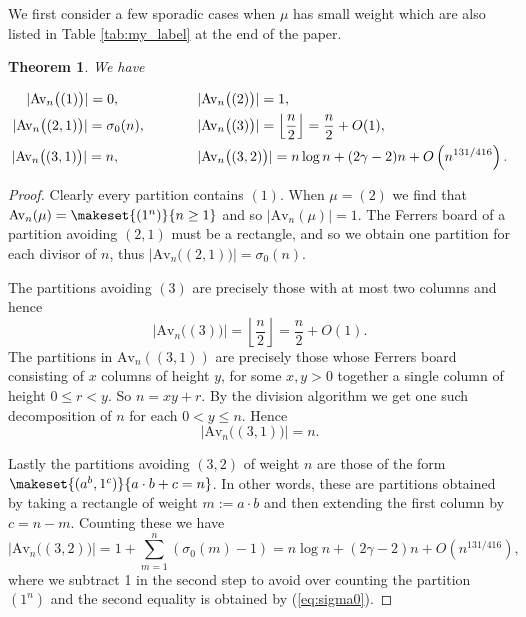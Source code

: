 \documentclass{article}
\theoremstyle{plain}
\newtheorem{theorem}{Theorem}[section]
\theoremstyle{definition}
\newcommand{\Av}{\text{Av}}
\begin{document}
We first consider a few sporadic cases when $\mu$ has small weight which are also listed in Table \ref{tab:my_label} at the end of the paper.
\begin{theorem} \label{thm:sporadic}
We have  
\end{theorem} 
\vspace{-8mm}  %
\begin{align*}
    |\Av_n \big((1)\big)| = 0,  \hspace{1cm} & \hspace{1cm} |\Av_n \big((2)\big)| = 1, \\
    |\Av_n \big((2,1)\big)| = \sigma_0(n), \hspace{0.35cm} & \hspace{1cm}
    |\Av_n \big((3)\big)| = \left \lfloor \frac{n}{2}\right\rfloor = \frac{n}{2} + O(1), \\
    |\Av_n \big((3,1)\big)| = n, \hspace{1cm} & \hspace{1cm} 
    |\Av_n \big((3,2)\big)| = n\log n + (2\gamma -2)n + O\left(n^{131/416}\right).
\end{align*}
\begin{proof}
Clearly every partition contains $(1)$.  When $\mu = (2)$ we find that $\Av_n(\mu)=\makeset{(1^n)}{n\geq 1}$ and so $|\Av_n(\mu)| = 1$.  The Ferrers board of a partition avoiding $(2,1)$ must be a rectangle, and so we obtain one partition for each divisor of $n$, thus $|\Av_n \big((2,1)\big)| = \sigma_0(n)$.

The partitions avoiding $(3)$ are precisely those with at most two columns and hence $$|\Av_n\big((3)\big)| = \left \lfloor \frac{n}{2}\right\rfloor = \frac{n}{2} + O(1).$$  
The partitions in $\Av_n((3,1))$ are precisely those whose Ferrers board consisting of $x$ columns of height $y$, for some $x,y>0$ together a single column of height $0\leq r< y$.  So  $n= xy + r$.  By the division algorithm we get one such decomposition of $n$ for each $0<y\leq n$.  Hence  $$|\Av_n\big((3,1)\big)| = n.$$  

Lastly the partitions avoiding $(3,2)$ of weight $n$ are those of the form $\makeset{(a^b,1^c)}{a\cdot b+c =n}$.  In other words, these are partitions obtained by taking a rectangle of weight $m:=a\cdot b$  and then extending the first column by $c = n-m$.  Counting these we have
$$|\Av_n\big((3,2)\big)|=  1+ \sum_{m=1}^n (\sigma_0(m) - 1) = n\log n + (2\gamma -2)n + O(n^{131/416}),$$
where we subtract 1 in the second step to avoid over counting the partition $(1^n)$ and the second equality is obtained by (\ref{eq:sigma0}).
\end{proof} 
\end{document}
